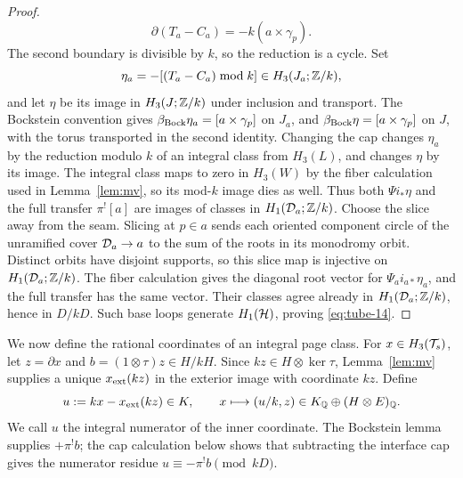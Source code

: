 \begin{proof}
\[ \partial(T_a-C_a)=-k(a\times\gamma_p).
\]
The second boundary is divisible by \(k\), so the reduction is a cycle.
Set
\[
\eta_a=-[(T_a-C_a)\bmod k]\in H_3(J_a;\mathbb Z/k),
\]
and let \(\eta\) be its image in \(H_3(J;\mathbb Z/k)\) under inclusion
and transport.
The Bockstein convention gives
\(\beta_{\rm Bock}\eta_a=[a\times\gamma_p]\) on \(J_a\), and
\(\beta_{\rm Bock}\eta=[a\times\gamma_p]\) on \(J\), with the
torus transported in the second identity. Changing the cap changes
\(\eta_a\) by the reduction modulo \(k\) of an integral class from
\(H_3(L)\), and changes \(\eta\) by its image. The integral class
maps to zero in \(H_3(W)\) by the fiber
calculation used in Lemma~\ref{lem:mv}, so its mod-\(k\) image
dies as well.
Thus both
\(\Psi i_*\eta\) and the full transfer \(\pi^![a]\) are
images of classes in \(H_1(\mathcal D_a;\mathbb Z/k)\).
Choose the slice away from the seam. Slicing at \(p\in a\) sends each oriented component circle
of the unramified cover \(\mathcal D_a\to a\) to the sum of the
roots in its monodromy orbit. Distinct orbits have
disjoint supports, so this slice map is injective on
\(H_1(\mathcal D_a;\mathbb Z/k)\). The fiber calculation gives the
diagonal root vector for \(\Psi_a i_{a*}\eta_a\), and the
full transfer has the same vector. Their classes agree
already in \(H_1(\mathcal D_a;\mathbb Z/k)\), hence in \(D/kD\).
Such base loops generate
\(H_1(\mathcal H)\), proving \eqref{eq:tube-14}.
\end{proof}

We now define the rational coordinates of an integral page class.
For \(x\in H_3(\mathcal T_s)\), let \(z=\partial x\) and
\(b=(1\otimes\tau)z\in H/kH\). Since
\(kz\in H\otimes\ker\tau\), Lemma~\ref{lem:mv} supplies a unique
\(x_{\rm ext}(kz)\) in the exterior image with coordinate \(kz\).
Define
\[
u:=kx-x_{\rm ext}(kz)\in K,\qquad
x\longmapsto (u/k,z)\in K_\mathbb Q\oplus(H\otimes E)_\mathbb Q.
\]
We call \(u\) the integral numerator of the inner coordinate.
The Bockstein lemma supplies \(+\pi^!b\); the cap calculation below
shows that subtracting the interface cap gives the numerator residue
\(u\equiv-\pi^!b\pmod{kD}\).

